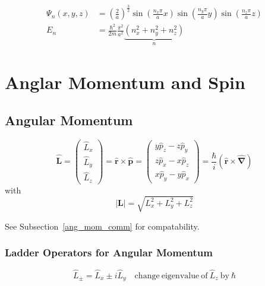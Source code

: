 \noindent\begin{align*}
    \Psi_n \left(x,y,z\right) & ={\left(\frac{2}{a}\right)}^{\frac{3}{2}} \sin\left(\frac{n_{x}\pi}{a}x\right)\sin\left(\frac{n_{y}\pi}{a}y\right)\sin\left(\frac{n_{z}\pi}{a}z\right) \\
    E_n                       & = \frac{\hbar^{2}}{2m} \frac{\pi^{2}}{a^{2}} \underbrace{\left(n_{x}^{2}+n_{y}^{2}+n_{z}^{2}\right)}_{n}
\end{align*}

\section{Anglar Momentum and Spin}
\subsection{Angular Momentum}
\noindent\begin{equation*}
    \widehat{\mathbf{L}}=
    \begin{pmatrix}
        \widehat{L}_x \\
        \widehat{L}_y \\
        \widehat{L}_z
    \end{pmatrix}
    =\widehat{\mathbf{r}}\times\widehat{\mathbf{p}}
    =
    \begin{pmatrix}
        y\widehat{p}_z-z\widehat{p}_y \\
        z\widehat{p}_x-x\widehat{p}_z \\
        x\widehat{p}_y-y\widehat{p}_x
    \end{pmatrix}
    =\frac{\hbar}{i}(\mathbf{\widehat{r}}\times\widehat{\mathbf{\nabla}})
\end{equation*}
with
\begin{equation*}
    |\mathbf{L}|=\sqrt{L_{x}^{2}+L_{y}^{2}+L_{z}^{2}}
\end{equation*}

See Subsection~\ref{ang_mom_comm} for compatability.

\subsubsection{Ladder Operators for Angular Momentum}

\noindent\begin{equation*}
    \widehat{L}_{\pm}=\widehat{L}_x\pm i \widehat{L}_y \quad \mathrm{change\ eigenvalue\ of\ } \widehat{L}_z \mathrm{\ by\ } \hbar
\end{equation*}

